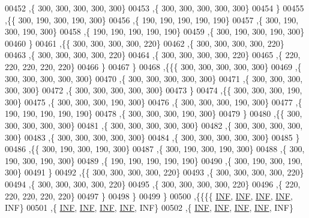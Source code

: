 \begin{DoxyCode}
00452    ,\{   300,   300,   300,   300,   300\}
00453    ,\{   300,   300,   300,   300,   300\}
00454    \}
00455   ,\{\{   300,   190,   300,   190,   300\}
00456    ,\{   190,   190,   190,   190,   190\}
00457    ,\{   300,   190,   300,   190,   300\}
00458    ,\{   190,   190,   190,   190,   190\}
00459    ,\{   300,   190,   300,   190,   300\}
00460    \}
00461   ,\{\{   300,   300,   300,   300,   220\}
00462    ,\{   300,   300,   300,   300,   220\}
00463    ,\{   300,   300,   300,   300,   220\}
00464    ,\{   300,   300,   300,   300,   220\}
00465    ,\{   220,   220,   220,   220,   220\}
00466    \}
00467   \}
00468  ,\{\{\{   300,   300,   300,   300,   300\}
00469    ,\{   300,   300,   300,   300,   300\}
00470    ,\{   300,   300,   300,   300,   300\}
00471    ,\{   300,   300,   300,   300,   300\}
00472    ,\{   300,   300,   300,   300,   300\}
00473    \}
00474   ,\{\{   300,   300,   300,   190,   300\}
00475    ,\{   300,   300,   300,   190,   300\}
00476    ,\{   300,   300,   300,   190,   300\}
00477    ,\{   190,   190,   190,   190,   190\}
00478    ,\{   300,   300,   300,   190,   300\}
00479    \}
00480   ,\{\{   300,   300,   300,   300,   300\}
00481    ,\{   300,   300,   300,   300,   300\}
00482    ,\{   300,   300,   300,   300,   300\}
00483    ,\{   300,   300,   300,   300,   300\}
00484    ,\{   300,   300,   300,   300,   300\}
00485    \}
00486   ,\{\{   300,   190,   300,   190,   300\}
00487    ,\{   300,   190,   300,   190,   300\}
00488    ,\{   300,   190,   300,   190,   300\}
00489    ,\{   190,   190,   190,   190,   190\}
00490    ,\{   300,   190,   300,   190,   300\}
00491    \}
00492   ,\{\{   300,   300,   300,   300,   220\}
00493    ,\{   300,   300,   300,   300,   220\}
00494    ,\{   300,   300,   300,   300,   220\}
00495    ,\{   300,   300,   300,   300,   220\}
00496    ,\{   220,   220,   220,   220,   220\}
00497    \}
00498   \}
00499  \}
00500 ,\{\{\{\{   \hyperlink{energy__const_8h_a12c2040f25d8e3a7b9e1c2024c618cb6}{INF},   \hyperlink{energy__const_8h_a12c2040f25d8e3a7b9e1c2024c618cb6}{INF},   \hyperlink{energy__const_8h_a12c2040f25d8e3a7b9e1c2024c618cb6}{INF},   \hyperlink{energy__const_8h_a12c2040f25d8e3a7b9e1c2024c618cb6}{INF},   INF\}
00501    ,\{   \hyperlink{energy__const_8h_a12c2040f25d8e3a7b9e1c2024c618cb6}{INF},   \hyperlink{energy__const_8h_a12c2040f25d8e3a7b9e1c2024c618cb6}{INF},   \hyperlink{energy__const_8h_a12c2040f25d8e3a7b9e1c2024c618cb6}{INF},   \hyperlink{energy__const_8h_a12c2040f25d8e3a7b9e1c2024c618cb6}{INF},   INF\}
00502    ,\{   \hyperlink{energy__const_8h_a12c2040f25d8e3a7b9e1c2024c618cb6}{INF},   \hyperlink{energy__const_8h_a12c2040f25d8e3a7b9e1c2024c618cb6}{INF},   \hyperlink{energy__const_8h_a12c2040f25d8e3a7b9e1c2024c618cb6}{INF},   \hyperlink{energy__const_8h_a12c2040f25d8e3a7b9e1c2024c618cb6}{INF},   INF\}

\end{DoxyCode}
